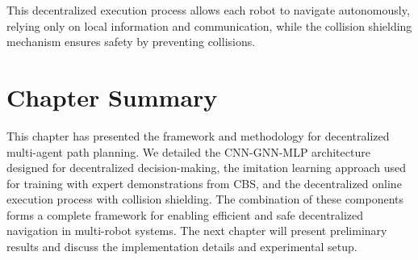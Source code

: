 This decentralized execution process allows each robot to navigate autonomously, relying only on local information and communication, while the collision shielding mechanism ensures safety by preventing collisions.

\section{Chapter Summary}

This chapter has presented the framework and methodology for decentralized multi-agent path planning. We detailed the CNN-GNN-MLP architecture designed for decentralized decision-making, the imitation learning approach used for training with expert demonstrations from CBS, and the decentralized online execution process with collision shielding. The combination of these components forms a complete framework for enabling efficient and safe decentralized navigation in multi-robot systems. The next chapter will present preliminary results and discuss the implementation details and experimental setup.